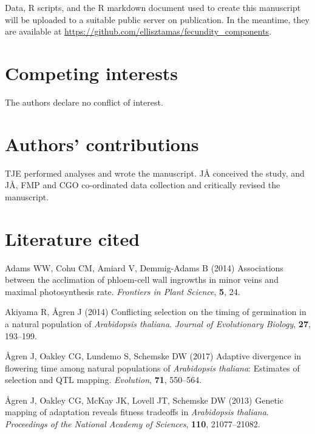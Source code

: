\documentclass[12pt,]{article}
\begin{document}
Data, R scripts, and the R markdown document used to create this manuscript will be uploaded to a suitable public server on publication. In the meantime, they are available at \url{https://github.com/ellisztamas/fecundity_components}.

\hypertarget{competing-interests}{%
\section{Competing interests}\label{competing-interests}}

The authors declare no conflict of interest.

\hypertarget{authors-contributions}{%
\section{Authors' contributions}\label{authors-contributions}}

TJE performed analyses and wrote the manuscript. JÅ conceived the study, and JÅ, FMP and CGO co-ordinated data collection and critically revised the manuscript.

\hypertarget{literature-cited}{%
\section*{Literature cited}\label{literature-cited}}

\hypertarget{refs}{}
\leavevmode\hypertarget{ref-adams2014associations}{}%
Adams WW, Cohu CM, Amiard V, Demmig-Adams B (2014) Associations between the acclimation of phloem-cell wall ingrowths in minor veins and maximal photosynthesis rate. \emph{Frontiers in Plant Science}, \textbf{5}, 24.

\leavevmode\hypertarget{ref-akiyama2014conflicting}{}%
Akiyama R, Ågren J (2014) Conflicting selection on the timing of germination in a natural population of \emph{Arabidopsis thaliana}. \emph{Journal of Evolutionary Biology}, \textbf{27}, 193--199.

\leavevmode\hypertarget{ref-agren_flowering_time}{}%
Ågren J, Oakley CG, Lundemo S, Schemske DW (2017) Adaptive divergence in flowering time among natural populations of \emph{Arabidopsis thaliana}: Estimates of selection and QTL mapping. \emph{Evolution}, \textbf{71}, 550--564.

\leavevmode\hypertarget{ref-agren_genetic_2013}{}%
Ågren J, Oakley CG, McKay JK, Lovell JT, Schemske DW (2013) Genetic mapping of adaptation reveals fitness tradeoffs in \emph{Arabidopsis thaliana}. \emph{Proceedings of the National Academy of Sciences}, \textbf{110}, 21077--21082.
\end{document}
